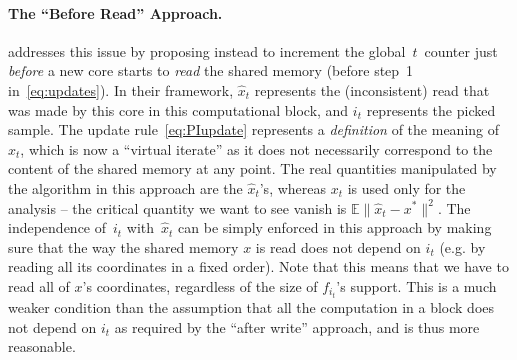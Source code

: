 \documentclass[twoside]{article}
\newcommand{\E}{\mathbb{E}}
\begin{document}
\paragraph{The ``Before Read'' Approach.}
\citet{mania} addresses this issue by proposing instead to increment the global~$t$~counter just \emph{before} a new core starts to \emph{read} the shared memory (before step~1 in~\eqref{eq:updates}).  
In their framework, $\hat{x}_t$ represents the (inconsistent) read that was made by this core in this computational block, and $i_t$ represents the picked sample. 
The update rule~\eqref{eq:PIupdate} represents a \emph{definition} of the meaning of $x_t$, which is now a ``virtual iterate'' as it does not necessarily correspond to the content of the shared memory at any point. 
The real quantities manipulated by the algorithm in this approach are the $\hat{x}_t$'s, whereas $x_t$ is used only for the analysis -- the critical quantity we want to see vanish is $\E \|\hat x_t - x^*\|^2$.
The independence of~$i_t$ with~$\hat{x}_t$ can be simply enforced in this approach by making sure that the way the shared memory $x$ is read does not depend on $i_t$ (e.g. by reading all its coordinates in a fixed order). Note that this means that we have to read all of $x$'s coordinates, regardless of the size of $f_{i_t}$'s support. 
This is a much weaker condition than the assumption that all the computation in a block does not depend on $i_t$ as required by the ``after write'' approach, and is thus more reasonable.

\vspace{-2mm}
\end{document}

